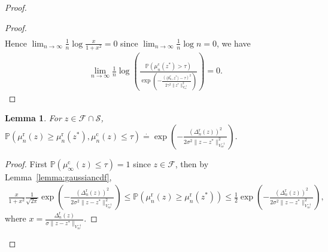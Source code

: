 \documentclass[accepted]{uai2025} %
\theoremstyle{plain}
\newtheorem{lemma}[theorem]{Lemma}
\theoremstyle{definition}
\theoremstyle{remark}
\newcommand{\thetac}{\theta^{\mathrm{c}}}
\newcommand{\Deltar}{\Delta^{\mathrm{r}}}
\newcommand{\muc}{\mu^{\mathrm{c}}}
\newcommand{\mur}{\mu^{\mathrm{r}}}
\newcommand{\PP}{\mathbb{P}} %
\begin{document}
\begin{proof}
\begin{proof}
\begin{align*}
\end{align*}
Hence $\lim_{n\rightarrow \infty} \frac{1}{n}\log \frac{x}{1+x^2}=0$ since $\lim_{n\rightarrow \infty} \frac{1}{n}\log n=0$, we have
\begin{align*}
   \lim_{n\rightarrow \infty}\frac{1}{n}\log \left(\frac{\PP(\muc_{n}(z^*)> \tau)}{\exp \left( -\frac{(\langle \thetac_n, z^*\rangle-\tau)^2}{2\gamma^2 \lVert z^* \rVert^2_{V^{-1}_{nc}}} \right)}\right)=0.
\end{align*}
\end{proof}












\begin{lemma}
\label{lem:asp2}
For $z\in {\mathcal{F}}\cap {\mathcal{S}}$,
    $\PP(\mur_{n}(z)\ge \mur_{n}(z^*), \muc_{n}(z)\le \tau)\stackrel{\cdot}{=}\exp\left(-\frac{(\Deltar_n(z))^2}{2\sigma^2 \lVert z-z^* \rVert^2_{V^{-1}_{nr}}}\right)$.
\end{lemma}

\begin{proof}
First $\PP(\muc_{\infty}(z)\le \tau)=1$ since $z\in \mathcal{F}$, then
 by Lemma~\ref{lemma:gaussiancdf},
\begin{align*}
   \frac{x}{1+x^2} \frac{1}{\sqrt{2\pi}}\exp\left( -\frac{(\Deltar_{n}(z))^2}{2\sigma^2\lVert z-z^* \rVert^2_{V^{-1}_{nr}}}\right)\le\PP(\mur_{n}(z)\ge \mur_{n}(z^*) )\le \frac{1}{2}\exp \left( -\frac{(\Deltar_n(z))^2}{2\sigma^2 \lVert z-z^* \rVert^2_{V^{-1}_{nr}}}\right),
\end{align*}
where $x=\frac{\Deltar_{n}(z)}{\sigma\lVert z-z^*\rVert_{V^{-1}_{nr}}}$.



\end{proof}
\end{proof}
\end{document}
